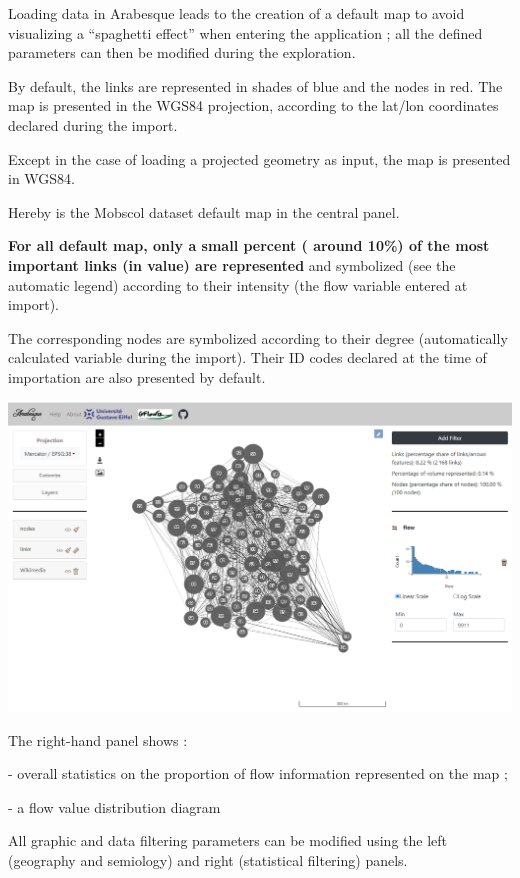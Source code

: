 \documentclass[
  letterpaper,
  DIV=11,
  numbers=noendperiod]{scrreprt}
\begin{document}
Loading data in Arabesque leads to the creation of a default map to
avoid visualizing a ``spaghetti effect'' when entering the application ;
all the defined parameters can then be modified during the exploration.

By default, the links are represented in shades of blue and the nodes in
red. The map is presented in the WGS84 projection, according to the
lat/lon coordinates declared during the import.

Except in the case of loading a projected geometry as input, the map is
presented in WGS84.

Hereby is the Mobscol dataset default map in the central panel.

\textbf{For all default map, only a small percent ( around 10\%) of the
most important links (in value) are represented} and symbolized (see the
automatic legend) according to their intensity (the flow variable
entered at import).

The corresponding nodes are symbolized according to their degree
(automatically calculated variable during the import). Their ID codes
declared at the time of importation are also presented by default.

\includegraphics{images/default_flowmap-mobscol.png}

The right-hand panel shows :

- overall statistics on the proportion of flow information represented
on the map ;

- a flow value distribution diagram

All graphic and data filtering parameters can be modified using the left
(geography and semiology) and right (statistical filtering) panels.

\end{document}
